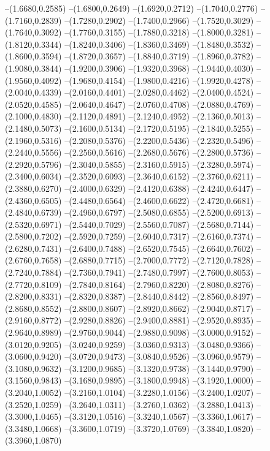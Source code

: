 {\begin{scope}
--(1.6680,0.2585)
--(1.6800,0.2649)
--(1.6920,0.2712)
--(1.7040,0.2776)
--(1.7160,0.2839)
--(1.7280,0.2902)
--(1.7400,0.2966)
--(1.7520,0.3029)
--(1.7640,0.3092)
--(1.7760,0.3155)
--(1.7880,0.3218)
--(1.8000,0.3281)
--(1.8120,0.3344)
--(1.8240,0.3406)
--(1.8360,0.3469)
--(1.8480,0.3532)
--(1.8600,0.3594)
--(1.8720,0.3657)
--(1.8840,0.3719)
--(1.8960,0.3782)
--(1.9080,0.3844)
--(1.9200,0.3906)
--(1.9320,0.3968)
--(1.9440,0.4030)
--(1.9560,0.4092)
--(1.9680,0.4154)
--(1.9800,0.4216)
--(1.9920,0.4278)
--(2.0040,0.4339)
--(2.0160,0.4401)
--(2.0280,0.4462)
--(2.0400,0.4524)
--(2.0520,0.4585)
--(2.0640,0.4647)
--(2.0760,0.4708)
--(2.0880,0.4769)
--(2.1000,0.4830)
--(2.1120,0.4891)
--(2.1240,0.4952)
--(2.1360,0.5013)
--(2.1480,0.5073)
--(2.1600,0.5134)
--(2.1720,0.5195)
--(2.1840,0.5255)
--(2.1960,0.5316)
--(2.2080,0.5376)
--(2.2200,0.5436)
--(2.2320,0.5496)
--(2.2440,0.5556)
--(2.2560,0.5616)
--(2.2680,0.5676)
--(2.2800,0.5736)
--(2.2920,0.5796)
--(2.3040,0.5855)
--(2.3160,0.5915)
--(2.3280,0.5974)
--(2.3400,0.6034)
--(2.3520,0.6093)
--(2.3640,0.6152)
--(2.3760,0.6211)
--(2.3880,0.6270)
--(2.4000,0.6329)
--(2.4120,0.6388)
--(2.4240,0.6447)
--(2.4360,0.6505)
--(2.4480,0.6564)
--(2.4600,0.6622)
--(2.4720,0.6681)
--(2.4840,0.6739)
--(2.4960,0.6797)
--(2.5080,0.6855)
--(2.5200,0.6913)
--(2.5320,0.6971)
--(2.5440,0.7029)
--(2.5560,0.7087)
--(2.5680,0.7144)
--(2.5800,0.7202)
--(2.5920,0.7259)
--(2.6040,0.7317)
--(2.6160,0.7374)
--(2.6280,0.7431)
--(2.6400,0.7488)
--(2.6520,0.7545)
--(2.6640,0.7602)
--(2.6760,0.7658)
--(2.6880,0.7715)
--(2.7000,0.7772)
--(2.7120,0.7828)
--(2.7240,0.7884)
--(2.7360,0.7941)
--(2.7480,0.7997)
--(2.7600,0.8053)
--(2.7720,0.8109)
--(2.7840,0.8164)
--(2.7960,0.8220)
--(2.8080,0.8276)
--(2.8200,0.8331)
--(2.8320,0.8387)
--(2.8440,0.8442)
--(2.8560,0.8497)
--(2.8680,0.8552)
--(2.8800,0.8607)
--(2.8920,0.8662)
--(2.9040,0.8717)
--(2.9160,0.8772)
--(2.9280,0.8826)
--(2.9400,0.8881)
--(2.9520,0.8935)
--(2.9640,0.8989)
--(2.9760,0.9044)
--(2.9880,0.9098)
--(3.0000,0.9152)
--(3.0120,0.9205)
--(3.0240,0.9259)
--(3.0360,0.9313)
--(3.0480,0.9366)
--(3.0600,0.9420)
--(3.0720,0.9473)
--(3.0840,0.9526)
--(3.0960,0.9579)
--(3.1080,0.9632)
--(3.1200,0.9685)
--(3.1320,0.9738)
--(3.1440,0.9790)
--(3.1560,0.9843)
--(3.1680,0.9895)
--(3.1800,0.9948)
--(3.1920,1.0000)
--(3.2040,1.0052)
--(3.2160,1.0104)
--(3.2280,1.0156)
--(3.2400,1.0207)
--(3.2520,1.0259)
--(3.2640,1.0311)
--(3.2760,1.0362)
--(3.2880,1.0413)
--(3.3000,1.0465)
--(3.3120,1.0516)
--(3.3240,1.0567)
--(3.3360,1.0617)
--(3.3480,1.0668)
--(3.3600,1.0719)
--(3.3720,1.0769)
--(3.3840,1.0820)
--(3.3960,1.0870)

\end{scope}}
